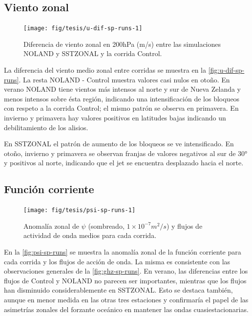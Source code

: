 \documentclass[spanish,a4paper,12pt,oneside]{book}
\begin{document}
\hypertarget{viento-zonal-2}{%
\subsection{Viento zonal}\label{viento-zonal-2}}

\begin{landscape}\begin{figure}

{\centering \texttt{[image: fig/tesis/u-dif-sp-runs-1]} 

}

\caption{Diferencia de viento zonal en 200hPa (m/s) entre las simulaciones NOLAND y SSTZONAL y la corrida Control.}\label{fig:u-dif-sp-runs}
\end{figure}
\end{landscape}

La diferencia del viento medio zonal entre corridas se muestra en la
\autoref{fig:u-dif-sp-runs}. La resta NOLAND - Control muestra valores
casi nulos en otoño. En verano NOLAND tiene vientos más intensos al
norte y sur de Nueva Zelanda y menos intensos sobre ésta región,
indicando una intensificación de los bloqueos con respeto a la corrida
Control; el mismo patrón se observa en primavera. En invierno y
primavera hay valores positivos en latitudes bajas indicando un
debilitamiento de los alisios.

En SSTZONAL el patrón de aumento de los bloqueos se ve intensificado. En
otoño, invierno y primavera se observan franjas de valores negativos al
sur de 30° y positivos al norte, indicando que el jet se encuentra
desplazado hacia el norte.

\hypertarget{funcion-corriente-2}{%
\subsection{Función corriente}\label{funcion-corriente-2}}

\begin{landscape}\begin{figure}

{\centering \texttt{[image: fig/tesis/psi-sp-runs-1]} 

}

\caption{Anomalía zonal de $\psi$ (sombreado,  $1\times10^{-7}m^2/s$) y flujos de actividad de onda medios para cada corrida.}\label{fig:psi-sp-runs}
\end{figure}
\end{landscape}

En la \autoref{fig:psi-sp-runs} se muestra la anomalía zonal de la
función corriente para cada corrida y los flujos de acción de onda. La
misma es consistente con las observaciones generales de la
\autoref{fig:ghz-sp-runs}. En verano, las diferencias entre los flujos
de Control y NOLAND no parecen ser importantes, mientras que los flujos
han disminuido considerablemente en SSTZONAL. Esto se destaca también,
aunque en menor medida en las otras tres estaciones y confirmaría el
papel de las asimetrías zonales del forzante oceánico en mantener las
ondas cuasiestacionarias.
\end{document}

